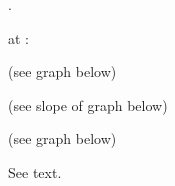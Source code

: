 {\begin{one-digit-list}
\item [6.] \NullItem
\begin{one-digit-list}
\item [a.] 
\item [b.] .
\item [  ] at :
\begin{one-digit-list}
\item [  ]  (see graph below)
\item [  ]  (see slope of graph below)
\item [  ]  (see graph below)
\item [  ] 
\end{one-digit-list}
\item [c.] \NullItem

%
\item [d.] See text.
\end{one-digit-list}

\end{one-digit-list}

}%
